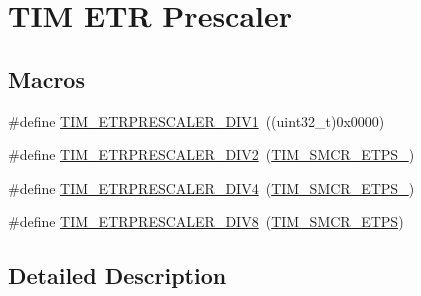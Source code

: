 \hypertarget{group___t_i_m___e_t_r___prescaler}{\section{T\-I\-M E\-T\-R Prescaler}
\label{group___t_i_m___e_t_r___prescaler}
}
\subsection*{Macros}
\begin{DoxyCompactItemize}
\item 
\#define \hyperlink{group___t_i_m___e_t_r___prescaler_gabead5364c62645592e42545ba09ab88a}{T\-I\-M\-\_\-\-E\-T\-R\-P\-R\-E\-S\-C\-A\-L\-E\-R\-\_\-\-D\-I\-V1}~((uint32\-\_\-t)0x0000)
\item 
\#define \hyperlink{group___t_i_m___e_t_r___prescaler_gaf7fe49f67bdb6b33b9b41953fee75680}{T\-I\-M\-\_\-\-E\-T\-R\-P\-R\-E\-S\-C\-A\-L\-E\-R\-\_\-\-D\-I\-V2}~(\hyperlink{group___peripheral___registers___bits___definition_ga00b43cd09557a69ed10471ed76b228d8}{T\-I\-M\-\_\-\-S\-M\-C\-R\-\_\-\-E\-T\-P\-S\-\_})
\item 
\#define \hyperlink{group___t_i_m___e_t_r___prescaler_gaa09da30c3cd28f1fe6b6f3f599a5212c}{T\-I\-M\-\_\-\-E\-T\-R\-P\-R\-E\-S\-C\-A\-L\-E\-R\-\_\-\-D\-I\-V4}~(\hyperlink{group___peripheral___registers___bits___definition_gabf12f04862dbc92ca238d1518b27b16b}{T\-I\-M\-\_\-\-S\-M\-C\-R\-\_\-\-E\-T\-P\-S\-\_})
\item 
\#define \hyperlink{group___t_i_m___e_t_r___prescaler_ga834e38200874cced108379b17a24d0b7}{T\-I\-M\-\_\-\-E\-T\-R\-P\-R\-E\-S\-C\-A\-L\-E\-R\-\_\-\-D\-I\-V8}~(\hyperlink{group___peripheral___registers___bits___definition_ga0ebb9e631876435e276211d88e797386}{T\-I\-M\-\_\-\-S\-M\-C\-R\-\_\-\-E\-T\-P\-S})
\end{DoxyCompactItemize}


\subsection{Detailed Description}


